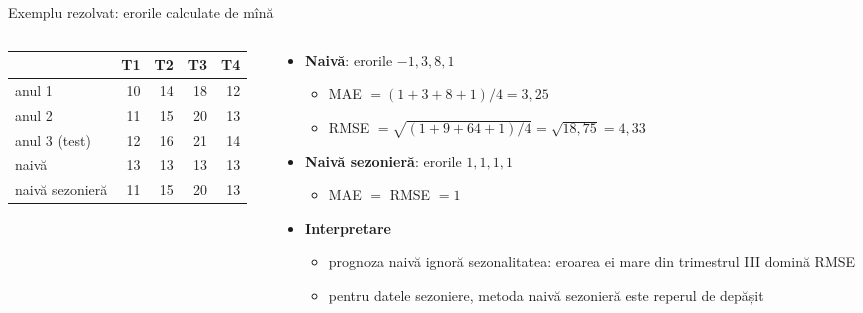 \begin{frame}{Exemplu rezolvat: erorile calculate de mînă}
\itemsize{\footnotesize}
\begin{columns}[T]
\begin{column}{0.46\textwidth}
\begin{center}
\footnotesize
\begin{tabular}{lrrrr}
\toprule
& T1 & T2 & T3 & T4 \\
\midrule
anul 1 & 10 & 14 & 18 & 12 \\
anul 2 & 11 & 15 & 20 & 13 \\
\midrule anul 3 (test) & 12 & 16 & 21 & 14 \\
naivă & 13 & 13 & 13 & 13 \\
naivă sezonieră & 11 & 15 & 20 & 13 \\
\bottomrule
\end{tabular}
\end{center}

\end{column}
\begin{column}{0.50\textwidth}
\begin{itemize}
    \item \textbf{Naivă}: erorile $-1, 3, 8, 1$
    \begin{itemize}
        \item MAE $= (1 + 3 + 8 + 1)/4 = 3{,}25$
        \item RMSE $= \sqrt{(1 + 9 + 64 + 1)/4} = \sqrt{18{,}75} = 4{,}33$
    \end{itemize}
    \item \textbf{Naivă sezonieră}: erorile $1, 1, 1, 1$
    \begin{itemize}
        \item MAE $=$ RMSE $= 1$
    \end{itemize}
    \item \textbf{Interpretare}
    \begin{itemize}
        \item prognoza naivă ignoră sezonalitatea: eroarea ei mare din trimestrul III domină RMSE
        \item pentru datele sezoniere, metoda naivă sezonieră este reperul de depășit
    \end{itemize}
\end{itemize}
\end{column}
\end{columns}
\end{frame}

